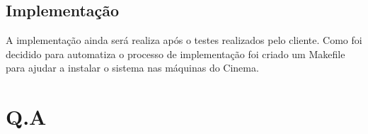 \documentclass[12pt,a4paper]{article}
\let\oldsection\section
\renewcommand\section{\clearpage\oldsection}
\begin{document}
\subsection{Implementação}
A implementação ainda será realiza após o testes realizados pelo cliente. Como
foi decidido para automatiza o processo de implementação foi criado um Makefile
para ajudar a instalar o sistema nas máquinas do Cinema.


\section{Q.A}
\end{document}
